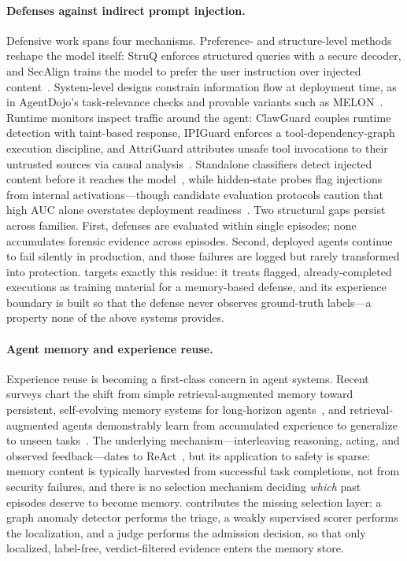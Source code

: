 \paragraph{Defenses against indirect prompt injection.}
Defensive work spans four mechanisms. Preference- and structure-level methods reshape the model itself: StruQ enforces structured queries with a secure decoder, and SecAlign trains the model to prefer the user instruction over injected content~\cite{chen2024struq,chen2024secalign}. System-level designs constrain information flow at deployment time, as in AgentDojo's task-relevance checks and provable variants such as MELON~\cite{debenedetti2024agentdojo,zhu2025melon}. Runtime monitors inspect traffic around the agent: ClawGuard couples runtime detection with taint-based response, IPIGuard enforces a tool-dependency-graph execution discipline, and AttriGuard attributes unsafe tool invocations to their untrusted sources via causal analysis~\cite{zhao2026clawguard,an2025ipiguard,he2026attriguard}. Standalone classifiers detect injected content before it reaches the model~\cite{shaheer2025detecting}, while hidden-state probes flag injections from internal activations---though candidate evaluation protocols caution that high AUC alone overstates deployment readiness~\cite{li2026when}. Two structural gaps persist across families. First, defenses are evaluated within single episodes; none accumulates forensic evidence across episodes. Second, deployed agents continue to fail silently in production, and those failures are logged but rarely transformed into protection. \method{} targets exactly this residue: it treats flagged, already-completed executions as training material for a memory-based defense, and its experience boundary is built so that the defense never observes ground-truth labels---a property none of the above systems provides.

\paragraph{Agent memory and experience reuse.}
Experience reuse is becoming a first-class concern in agent systems. Recent surveys chart the shift from simple retrieval-augmented memory toward persistent, self-evolving memory systems for long-horizon agents~\cite{huang2026survey,zhou2026ready}, and retrieval-augmented agents demonstrably learn from accumulated experience to generalize to unseen tasks~\cite{ferraz2026retrievalaugmented}. The underlying mechanism---interleaving reasoning, acting, and observed feedback---dates to ReAct~\cite{yao2022react}, but its application to safety is sparse: memory content is typically harvested from successful task completions, not from security failures, and there is no selection mechanism deciding \emph{which} past episodes deserve to become memory. \method{} contributes the missing selection layer: a graph anomaly detector performs the triage, a weakly supervised scorer performs the localization, and a judge performs the admission decision, so that only localized, label-free, verdict-filtered evidence enters the memory store.

